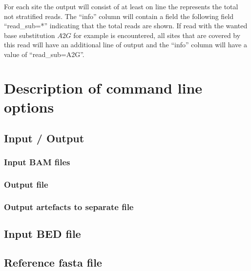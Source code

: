 \documentclass[10pt,a4paper,final]{article}
\begin{document}
For each site the output will consist of at least on line the represents the total not stratified reads.
The ``info'' column will contain a field the following field ``read\_sub=*'' indicating that the total 
reads are shown. If read with the wanted base substitution $A2G$ for example is encountered, all sites 
that are covered by this read will have an additional line of output and the ``info'' column will have 
a value of ``read\_sub=A2G''. 
\section{Description of command line options}
\subsection{Input / Output}
\subsubsection{Input BAM files}
\subsubsection{Output file}

\subsubsection{Output artefacts to separate file}\label{sec:separate_output}

\subsection{Input BED file}

\subsection{Reference fasta file}

\end{document}
